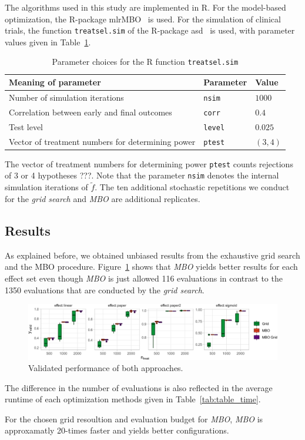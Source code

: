 \documentclass[bimj,fleqn]{w-art}
\theoremstyle{plain}
\theoremstyle{definition}
\begin{document}
The algorithms used in this study are implemented in R.
For the model-based optimization, the R-package mlrMBO~\citep{bischl_mlrmbo_2017} is used.
For the simulation of clinical trials, the function \texttt{treatsel.sim} of the R-package asd~\citep{parsons_software_2011} is used, with parameter values given in Table~\ref{tab:par_implement}.
\begin{table}[h]
  \caption{Parameter choices for the R function \texttt{treatsel.sim}}
  \label{tab:par_implement}
  \centering
  \begin{tabular}{lll}
  \hline
  Meaning of parameter & Parameter & Value \\
  \hline
  Number of simulation iterations & \texttt{nsim} & $1000$ \\
  Correlation between early and final outcomes & \texttt{corr} & $0.4$ \\
  Test level & \texttt{level} & $0.025$ \\
  Vector of treatment numbers for determining power & \texttt{ptest} & $(3,4)$ \\
  \hline
  \end{tabular}
\end{table}
The vector of treatment numbers for determining power \texttt{ptest} counts rejections of 3 or 4 hypotheses ???.
Note that the parameter \texttt{nsim} denotes the internal simulation iterations of $\tilde{f}$. 
The ten additional stochastic repetitions we conduct for the \emph{grid search} and \emph{MBO} are additional replicates.


\subsection{Results}

As explained before, we obtained unbiased results from the exhaustive grid search and the MBO procedure.
Figure~\ref{fig:plot_boxplot_valid_y} shows that \emph{MBO} yields better results for each effect set even though \emph{MBO} is just allowed 116 evaluations in contrast to the 1350 evaluations that are conducted by the \emph{grid search}.
\begin{figure}[htb]
\centering
\includegraphics[width=\linewidth]{generated/figures/plot_boxplot_valid_y.pdf}
\caption{%
  Validated performance of both approaches.
  }
\label{fig:plot_boxplot_valid_y}
\end{figure}
The difference in the number of evaluations is also reflected in the average runtime of each optimization methods given in Table~\ref{tab:table_time}.

For the chosen grid resoultion and evaluation budget for \emph{MBO}, \emph{MBO} is approxamatly 20-times faster and yields better configurations.
\end{document}
